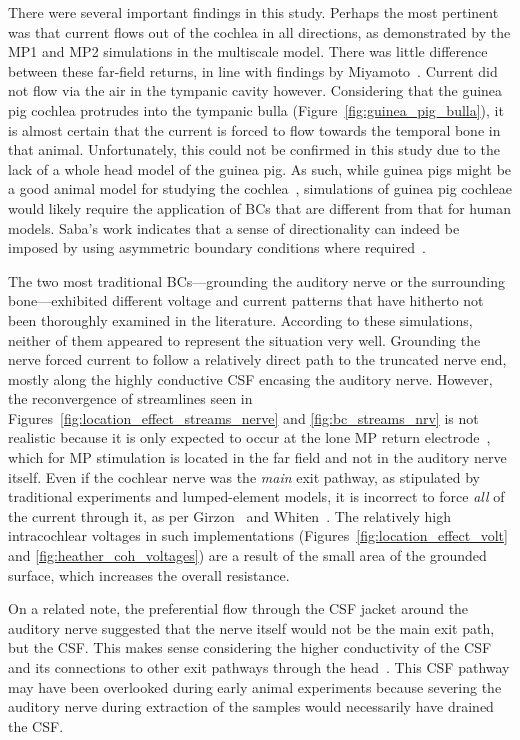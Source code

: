 There were several important findings in this study. Perhaps the most pertinent
was that current flows out of the cochlea in all directions, as demonstrated by
the MP1 and MP2 simulations in the multiscale model. There was little difference
between these far-field returns, in line with findings by
Miyamoto~\cite{miyamoto1986}. Current did not flow via the air in the tympanic
cavity however. Considering that the guinea pig cochlea protrudes into the
tympanic bulla (Figure~\ref{fig:guinea_pig_bulla}), it is almost certain that
the current is forced to flow towards the temporal bone in that animal.
Unfortunately, this could not be confirmed in this study due to the lack of a
whole head model of the guinea pig. As such, while guinea pigs might be a good
animal model for studying the cochlea~\cite{miyamoto1986}, simulations of guinea
pig cochleae would likely require the application of BCs that are different from
that for human models. Saba's work indicates that a sense of directionality can
indeed be imposed by using asymmetric boundary conditions where
required~\cite{saba2012}.

The two most traditional BCs---grounding the auditory nerve or the surrounding
bone---exhibited different voltage and current patterns that have hitherto not
been thoroughly examined in the literature. According to these simulations,
neither of them appeared to represent the \invivo{} situation very well.
Grounding the nerve forced current to follow a relatively direct path to the
truncated nerve end, mostly along the highly conductive CSF encasing the
auditory nerve. However, the reconvergence of streamlines seen in
Figures~\ref{fig:location_effect_streams_nerve} and \ref{fig:bc_streams_nrv} is
not realistic because it is only expected to occur at the lone MP return
electrode~\cite{baker1989}, which for MP stimulation is located in the far field
and not in the auditory nerve itself. Even if the cochlear nerve was the
\emph{main} exit pathway, as stipulated by traditional experiments and
lumped-element models, it is incorrect to force \emph{all} of the current
through it, as per Girzon~\cite{girzon1987} and Whiten~\cite{whiten2007}. The
relatively high intracochlear voltages in such implementations
(Figures~\ref{fig:location_effect_volt} and \ref{fig:heather_coh_voltages}) are
a result of the small area of the grounded surface, which increases the overall
resistance.

On a related note, the preferential flow through the CSF jacket around the
auditory nerve suggested that the nerve itself would not be the main exit path,
but the CSF. This makes sense considering the higher conductivity of the CSF and
its connections to other exit pathways through the head~\cite{tran2015}. This
CSF pathway may have been overlooked during early animal experiments because
severing the auditory nerve during extraction of the samples would necessarily
have drained the CSF.

